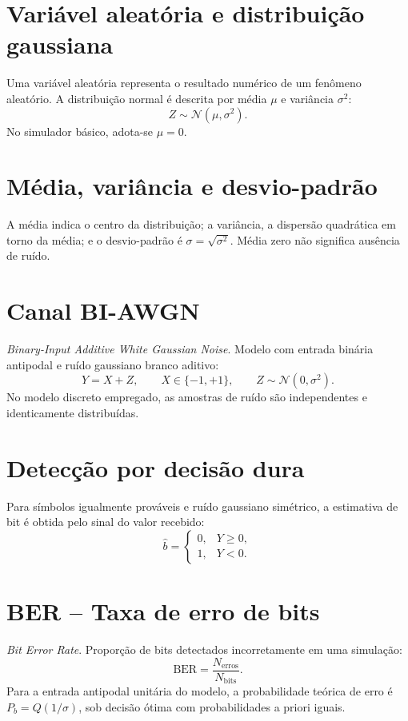 \documentclass[12pt,openright,oneside,a4paper,english,brazil]{abntex2}
\begin{document}
\section{Variável aleatória e distribuição gaussiana}
Uma variável aleatória representa o resultado numérico de um fenômeno aleatório. A distribuição normal é descrita por média $\mu$ e variância $\sigma^2$:
\begin{equation}
Z\sim\mathcal{N}(\mu,\sigma^2).
\end{equation}
No simulador básico, adota-se $\mu=0$.

\section{Média, variância e desvio-padrão}
A média indica o centro da distribuição; a variância, a dispersão quadrática em torno da média; e o desvio-padrão é $\sigma=\sqrt{\sigma^2}$. Média zero não significa ausência de ruído.

\section{Canal BI-AWGN}
\textit{Binary-Input Additive White Gaussian Noise}. Modelo com entrada binária antipodal e ruído gaussiano branco aditivo:
\begin{equation}
Y=X+Z,\qquad X\in\{-1,+1\},\qquad Z\sim\mathcal{N}(0,\sigma^2).
\end{equation}
No modelo discreto empregado, as amostras de ruído são independentes e identicamente distribuídas.

\section{Detecção por decisão dura}
Para símbolos igualmente prováveis e ruído gaussiano simétrico, a estimativa de bit é obtida pelo sinal do valor recebido:
\begin{equation}
\hat b=\begin{cases}
0,&Y\ge 0,\\
1,&Y<0.
\end{cases}
\end{equation}

\section{BER -- Taxa de erro de bits}
\textit{Bit Error Rate}. Proporção de bits detectados incorretamente em uma simulação:
\begin{equation}
\mathrm{BER}=\frac{N_{\mathrm{erros}}}{N_{\mathrm{bits}}}.
\end{equation}
Para a entrada antipodal unitária do modelo, a probabilidade teórica de erro é $P_b=Q(1/\sigma)$, sob decisão ótima com probabilidades a priori iguais.
\end{document}
